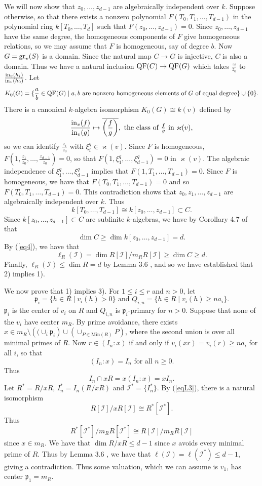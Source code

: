 \documentclass[11pt]{amsart}
\theoremstyle{definition}
\let\kappa=\varkappa
\begin{document}
We will now show that $z_0,\ldots,z_{d-1}$ are algebraically independent over $k$. Suppose otherwise, so that there exists a nonzero polynomial
$F(T_0,T_1,\ldots,T_{d-1})$ in the polynomial ring $k[T_0,\ldots,T_d]$ such that $F(z_0,\ldots,z_{d-1})=0$. Since $z_0,\ldots,z_{d-1}$ have the same degree, the homogeneous components of $F$ give homogeneous relations, so we may assume that $F$ is homogeneous, say of degree $b$. Now
$G={\rm gr}_v(S)$ is a domain. Since the natural map $C\rightarrow G$ is injective, $C$ is also a domain. Thus we have a natural inclusion
${\rm QF}(C)\rightarrow {\rm QF}(G)$ which takes $\frac{z_i}{z_0}$ to $\frac{{\rm in}_v(h_i)}{{\rm in}_v(h_0)}$.
Let 
$$
K_0(G)=\{\frac{a}{b}\in {\rm QF}(G)\mid a,b\mbox{ are nonzero homogeneous elements of $G$ of equal degree}\}\cup\{0\}.
$$
There is a canonical $k$-algebra isomorphism $K_0(G)\cong k(v)$ defined by 
$$
\frac{{\rm in}_v(f)}{{\rm in}_v(g)}\mapsto \overline{\left(\frac{f}{g}\right)},\mbox{ the class of 
$\frac{f}{g}$ in $\kappa(v)$},
$$
so we can identify $\frac{z_i}{z_0}$ with $\xi_i^q\in \kappa(v)$.
Since $F$ is homogeneous, $F(1,\frac{z_1}{z_0},\ldots,\frac{z_{d-1}}{z_0})=0$, so that $F(1,\xi_1^q,\ldots,\xi_{d-1}^q)=0$ in $\kappa(v)$. 
The algebraic independence of  $\xi_1^q,\ldots,\xi_{d-1}^q$ implies that $F(1,T_1,\ldots,T_{d-1})=0$. Since $F$ is homogeneous, we have that
$F(T_0,T_1,\ldots,T_{d-1})=0$ and so $F(T_0,T_1,\ldots,T_{d-1})=0$.
This contradiction shows that $z_0,z_1,\ldots,z_{d-1}$ are algebraically independent over $k$. Thus 
$$
k[T_0,\ldots,T_{d-1}]\cong k[z_0,\ldots,z_{d-1}]\subset C.
$$
Since $k[z_0,\ldots,z_{d-1}]\subset C$ are subfinite $k$-algebras, we have by Corollary 4.7 of \cite{KT} that 
$$
\dim C\ge \dim k[z_0,\ldots,z_{d-1}]=d.
$$ 
By (\ref{eq4}), we have that
$$
\ell_R(\mathcal I)=\dim R[\mathcal I]/m_RR[\mathcal I]\ge \dim C\ge d.
$$
Finally, $\ell_R(\mathcal I)\le \dim R=d$ by Lemma 3.6 \cite{CPS}, and so we have established that 2) implies 1).

We now prove that 1) implies 3). For $1\le i\le r$ and $n>0$, let
$$
\mathfrak p_i=\{h\in R\mid v_i(h)>0\}\mbox{ and }Q_{i,n}=\{h\in R\mid v_i(h)\ge na_i\}. 
$$
$\mathfrak p_i$ is the center of $v_i$ on $R$ and $Q_{i,n}$ is $\mathfrak p_i$-primary for $n>0$. 
Suppose that none of the $v_i$ have center $m_R$. By prime avoidance, there exists $x\in m_R\setminus\left((\cup_i\mathfrak p_i\right)\cup
\left(\cup_{P\in \mbox{Min}(R)}P\right)$, where the second union is over all minimal primes of $R$. Now $r\in (I_n:x)$ if and only if $v_i(xr)=v_i(r)\ge na_i$ for all $i$, so that 
$$(I_n:x)=I_n\mbox{ for all $n\ge 0$}.
$$
Thus 
\begin{equation}\label{eqL3}
I_n\cap xR=x(I_n:x)=xI_n.
\end{equation}
Let $R^*=R/xR$, $I_n^*=I_n(R/xR)$ and $\mathcal I^*=\{I_n^*\}$. By (\ref{eqL3}), there is a natural isomorphism
$$
R[\mathcal I]/xR[\mathcal I]\cong R^*[\mathcal I^*].
$$
Thus 
$$
R^*[\mathcal I^*]/m_RR[\mathcal I^*]\cong R[\mathcal I]/m_RR[\mathcal I]
$$
since $x\in m_R$. We have that $\dim R/xR\le d-1$ since $x$ avoids every minimal prime of $R$. Thus by Lemma 3.6 \cite{CPS}, we have that
$\ell(\mathcal I)=\ell(\mathcal I^*)\le d-1$, giving a contradiction. Thus some valuation, which we can assume is $v_1$, has center $\mathfrak p_1=m_R$.
\end{document}
